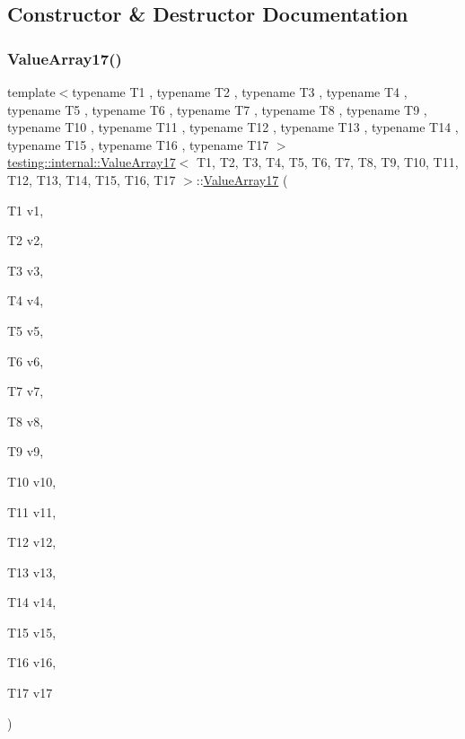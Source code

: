 \subsection{Constructor \& Destructor Documentation}
\mbox{\label{classtesting_1_1internal_1_1_value_array17_a943a86a365abde6bdd667e1ad2dbff9b}} 
\subsubsection{\texorpdfstring{ValueArray17()}{ValueArray17()}\hspace{0.1cm}{\footnotesize\ttfamily [1/2]}}
{\footnotesize\ttfamily template$<$typename T1 , typename T2 , typename T3 , typename T4 , typename T5 , typename T6 , typename T7 , typename T8 , typename T9 , typename T10 , typename T11 , typename T12 , typename T13 , typename T14 , typename T15 , typename T16 , typename T17 $>$ \\
\mbox{\hyperlink{classtesting_1_1internal_1_1_value_array17}{testing\+::internal\+::\+Value\+Array17}}$<$ T1, T2, T3, T4, T5, T6, T7, T8, T9, T10, T11, T12, T13, T14, T15, T16, T17 $>$\+::\mbox{\hyperlink{classtesting_1_1internal_1_1_value_array17}{Value\+Array17}} (\begin{DoxyParamCaption}\item[{T1}]{v1,  }\item[{T2}]{v2,  }\item[{T3}]{v3,  }\item[{T4}]{v4,  }\item[{T5}]{v5,  }\item[{T6}]{v6,  }\item[{T7}]{v7,  }\item[{T8}]{v8,  }\item[{T9}]{v9,  }\item[{T10}]{v10,  }\item[{T11}]{v11,  }\item[{T12}]{v12,  }\item[{T13}]{v13,  }\item[{T14}]{v14,  }\item[{T15}]{v15,  }\item[{T16}]{v16,  }\item[{T17}]{v17 }\end{DoxyParamCaption})\hspace{0.3cm}{\ttfamily [inline]}}

